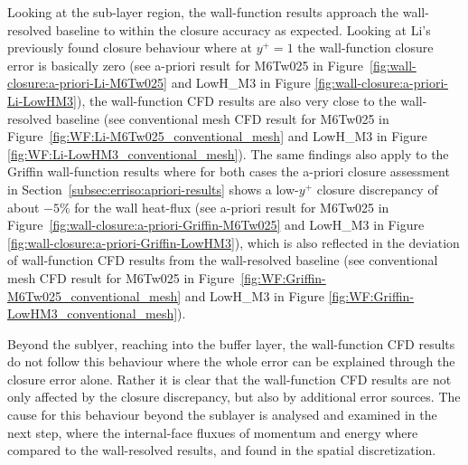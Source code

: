 Looking at the sub-layer region, the wall-function results approach the wall-resolved baseline to within the closure accuracy as expected. Looking at Li's previously found closure behaviour where at \(y^+ = 1\) the wall-function closure error is basically zero (see a-priori result for M6Tw025 in Figure~\ref{fig:wall-closure:a-priori-Li-M6Tw025} and LowH\_M3 in Figure \ref{fig:wall-closure:a-priori-Li-LowHM3}), the wall-function CFD results are also very close to the wall-resolved baseline (see conventional mesh CFD result for M6Tw025 in Figure~\ref{fig:WF:Li-M6Tw025_conventional_mesh} and LowH\_M3 in Figure \ref{fig:WF:Li-LowHM3_conventional_mesh}). The same findings also apply to the Griffin wall-function results where for both cases the a-priori closure assessment in Section~\ref{subsec:erriso:apriori-results} shows a low-$y^+$ closure discrepancy of about $-5\%$ for the wall heat-flux (see a-priori result for M6Tw025 in Figure~\ref{fig:wall-closure:a-priori-Griffin-M6Tw025} and LowH\_M3 in Figure \ref{fig:wall-closure:a-priori-Griffin-LowHM3}), which is also reflected in the deviation of wall-function CFD results from the wall-resolved baseline (see conventional mesh CFD result for M6Tw025 in Figure~\ref{fig:WF:Griffin-M6Tw025_conventional_mesh} and LowH\_M3 in Figure \ref{fig:WF:Griffin-LowHM3_conventional_mesh}).
\par\medskip

Beyond the sublyer, reaching into the buffer layer, the wall-function CFD results do not follow this behaviour where the whole error can be explained through the closure error alone. Rather it is clear that the wall-function CFD results are not only affected by the closure discrepancy, but also by additional error sources. The cause for this behaviour beyond the sublayer is analysed and examined in the next step, where the internal-face fluxues of momentum and energy where compared to the wall-resolved results, and found in the spatial discretization.
\par\medskip

